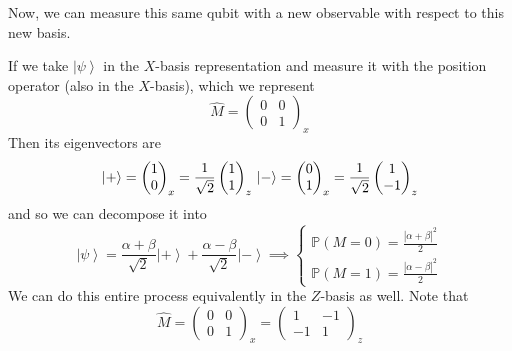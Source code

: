 \documentclass{article}
\newcommand{\ket}[1]{\ensuremath{\left|#1\right\rangle}}
\begin{document}
    Now, we can measure this same qubit with a new observable with respect to this new basis. 

    \begin{example} 
      If we take $\ket{\psi}$ in the $X$-basis representation and measure it with the position operator (also in the $X$-basis), which we represent 
      \begin{equation} 
        \hat{M} = \begin{pmatrix} 0 & 0 \\ 0 & 1 \end{pmatrix}_x
      \end{equation} 
      Then its eigenvectors are 
      \begin{equation} 
        \ket{+} = \begin{pmatrix} 1 \\ 0 \end{pmatrix}_x = \frac{1}{\sqrt{2}} \begin{pmatrix} 1 \\ 1 \end{pmatrix}_z \\ 
        \ket{-} = \begin{pmatrix} 0 \\ 1 \end{pmatrix}_x = \frac{1}{\sqrt{2}} \begin{pmatrix} 1 \\ -1 \end{pmatrix}_z 
      \end{equation}
      and so we can decompose it into 
      \begin{equation} 
        \ket{\psi} = \frac{\alpha + \beta}{\sqrt{2}} \ket{+} + \frac{\alpha - \beta}{\sqrt{2}} \ket{-} \implies \begin{cases} \mathbb{P}(M = 0) = \frac{|\alpha + \beta|^2}{2} \\ \mathbb{P}(M = 1) = \frac{|\alpha - \beta|^2}{2} \end{cases}
      \end{equation}
      We can do this entire process equivalently in the $Z$-basis as well. Note that 
      \begin{equation} 
        \hat{M} = \begin{pmatrix} 0 & 0 \\ 0 & 1 \end{pmatrix}_x = \begin{pmatrix} 1 & -1 \\ -1 & 1 \end{pmatrix}_z

\end{equation}
\end{example}
\end{document}
